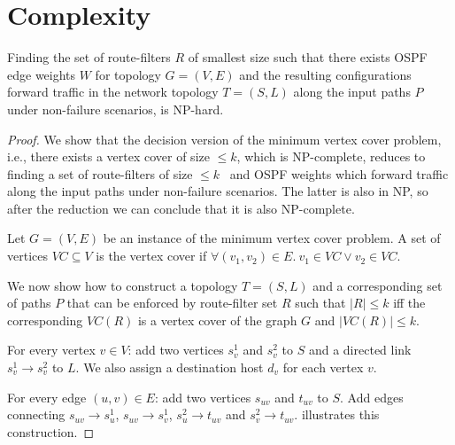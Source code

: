 \section{Complexity}
\begin{theorem}
Finding the set of route-filters $R$ of smallest size such
 that there exists OSPF edge weights $W$ for topology $G=(V,E)$ 
 and the resulting configurations forward traffic in the network
 topology $T=(S,L)$ along the
input paths $P$ under non-failure scenarios, is NP-hard.
\end{theorem}

\begin{proof}
We show that the decision version of the minimum 
vertex cover problem, i.e., there exists a vertex cover
of size $ \leq k$, which is NP-complete, 
reduces to finding a set of route-filters of size $ \leq k$ \
and OSPF weights which forward traffic along the
input paths under non-failure scenarios. 
The latter is also in NP, so after the reduction we 
can conclude that it is also NP-complete.

Let $G = (V,E)$ be an instance of the 
minimum vertex cover problem. A set of
vertices $VC \subseteq V$ is the vertex cover
if $\forall (v_1, v_2) \in E. ~v_1 \in VC \vee v_2 \in VC$. 

We now show how to construct a topology $T=(S,L)$ 
and a corresponding set of paths $P$ that can be 
enforced by route-filter set $R$ such that $|R| \leq k$  
iff the corresponding $VC(R)$ is a vertex cover of 
the graph $G$ and $|VC(R)| \leq k$.

For every vertex $v \in V$: add two vertices $s_v^1$ 
and $s_v^2$ to $S$ and a directed link $s_v^1 \rightarrow s_v^2$ to $L$. 
We also assign a destination host $d_v$ for each vertex $v$. 

For every edge $(u,v) \in E$: add two vertices $s_{uv}$
and $t_{uv}$ to $S$. Add edges
connecting $s_{uv} \rightarrow s_{u}^1$, $s_{uv} \rightarrow s_{v}^1$,
$s_{u}^2 \rightarrow t_{uv}$ and $s_{v}^2 \rightarrow t_{uv}$.  illustrates this construction.


\end{proof}

